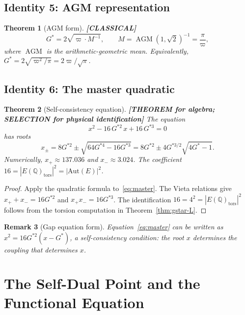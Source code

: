 \documentclass[11pt]{article}
\theoremstyle{tight}
\newtheorem{theorem}{Theorem}[section]
\theoremstyle{plainroman}
\newtheorem{remark}[theorem]{Remark}
\newcommand{\Q}{\mathbb{Q}}
\begin{document}
\subsection{Identity 5: AGM representation}

\begin{theorem}[AGM form]\label{thm:agm}
\textbf{[CLASSICAL]}
\[
G^*=2\sqrt{\varpi\cdot M^{-1}}, \qquad M=\operatorname{AGM}(1,\sqrt{2})^{-1}=\frac{\pi}{\varpi},
\]
where $\operatorname{AGM}$ is the arithmetic-geometric mean.
Equivalently, $G^*=2\sqrt{\varpi^2/\pi}=2\varpi/\sqrt{\pi}$.
\end{theorem}

\subsection{Identity 6: The master quadratic}

\begin{theorem}[Self-consistency equation]\label{thm:master}
\textbf{[THEOREM for algebra; SELECTION for physical identification]}
The equation
\begin{equation}\label{eq:master}
x^2-16\,G^{*2}\,x+16\,G^{*3}=0
\end{equation}
has roots
\[
x_\pm=8G^{*2}\pm\sqrt{64G^{*4}-16G^{*3}}=8G^{*2}\pm 4G^{*3/2}\sqrt{4G^*-1}.
\]
Numerically, $x_+\approx 137.036$ and $x_-\approx 3.024$.
The coefficient $16=|E(\Q)_{\mathrm{tors}}|^2=|\mathrm{Aut}(E)|^2$.
\end{theorem}
\begin{proof}
Apply the quadratic formula to~\eqref{eq:master}.
The Vieta relations give $x_++x_-=16G^{*2}$ and $x_+x_-=16G^{*3}$.
The identification $16=4^2=|E(\Q)_{\mathrm{tors}}|^2$ follows from the torsion computation in Theorem~\ref{thm:gstar-L}.
\end{proof}

\begin{remark}[Gap equation form]
Equation~\eqref{eq:master} can be written as $x^2=16G^{*2}(x-G^*)$, a self-consistency condition: the root $x$ determines the coupling that determines $x$.
\end{remark}

\section{The Self-Dual Point and the Functional Equation}
\end{document}
